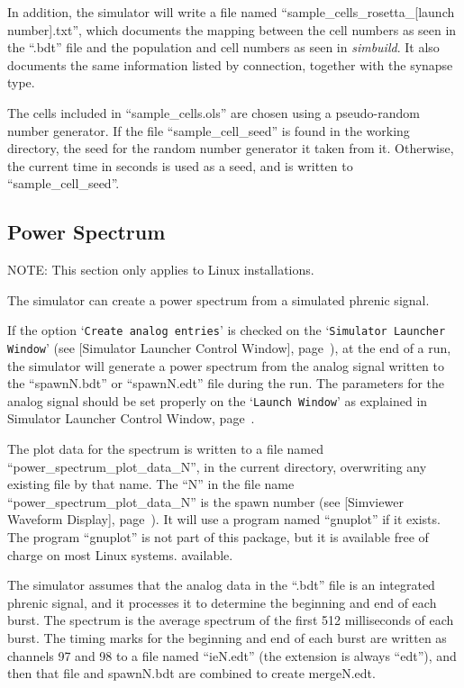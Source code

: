 \documentclass[12pt,openany,oneside]{book}
\newcommand{\tisamp}[1]{`\texttt{#1}'}
\newcommand{\tiref}[1]{#1, page~\pageref{#1}}
\newcommand{\tipxref}[1]{see [#1], page~\pageref{#1}}
\newcommand{\prog}[1]{\textit{{#1}}}
\newcommand{\ext}[1]{{{``.#1''}}}
\newcommand{\inquotes}[1]{{{``#1''}}}
\begin{document}
In addition, the simulator will write a file named
\inquotes{sample\_cells\_rosetta\_[launch number].txt}, which documents the mapping between the
cell numbers as seen in the \ext{bdt} file and the population and cell
numbers as seen in \prog{simbuild}. It also documents the same information
listed by connection, together with the synapse type.

The cells included in \inquotes{sample\_cells.ols} are chosen using a
pseudo-random number generator. If the file \inquotes{sample\_cell\_seed} is
found in the working directory, the seed for the random number
generator it taken from it. Otherwise, the current time in seconds is
used as a seed, and is written to \inquotes{sample\_cell\_seed}.

\subsection{Power Spectrum}
\label{Power Spectrum}

NOTE: This section only applies to Linux installations.

The simulator can create a power spectrum from a simulated phrenic signal.

If the option \tisamp{Create analog entries} is checked on the
\tisamp{Simulator Launcher Window} (\tipxref{Simulator Launcher Control
Window}), at the end of a run, the simulator will generate a power
spectrum from the analog signal written to the \inquotes{spawnN.bdt} or
\inquotes{spawnN.edt} file during the run. The parameters for the analog
signal should be set properly on the \tisamp{Launch Window} as explained
in \tiref{Simulator Launcher Control Window}.

The plot data for the spectrum is written to a file named
\inquotes{power\_spectrum\_plot\_data\_N}, in the current directory,
overwriting any existing file by that name. The \inquotes{N} in the file
name \inquotes{power\_spectrum\_plot\_data\_N} is the spawn number
(\tipxref{Simviewer Waveform Display}).  It will use a program named
\inquotes{gnuplot} if it exists. The program \inquotes{gnuplot} is not
part of this package, but it is available free of charge on most Linux
systems.  available.

The simulator assumes that the analog data in the \ext{bdt} file is an
integrated phrenic signal, and it processes it to determine the
beginning and end of each burst. The spectrum is the average spectrum
of the first 512 milliseconds of each burst. The timing marks for the beginning
and end of each burst are written as channels 97 and 98 to a file
named \inquotes{ieN.edt} (the extension is always \inquotes{edt}), 
and then that file and spawnN.bdt are combined to create mergeN.edt.
\end{document}
